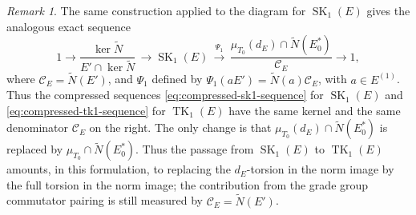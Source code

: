 \documentclass[11pt]{article}
\numberwithin{equation}{section}
\theoremstyle{plain}
\theoremstyle{remark}
\newtheorem{remark}[theorem]{Remark}
\begin{document}
\begin{remark}
\label{rem:compressed-sk1-comparison}
The same construction applied to the \cite{hazrat-wadsworth-2011} diagram for
$\operatorname{SK}_1(E)$ gives the analogous exact sequence
\begin{equation}\label{eq:compressed-sk1-sequence}
        1\longrightarrow
        \frac{\ker\widetilde N}{E'\cap\ker\widetilde N}\,
        \longrightarrow
        \operatorname{SK}_1(E)
        \,\overset{\Psi_1}{\longrightarrow}\,
        \frac{\mu_{T_0}(d_E)\cap\widetilde N(E_0^*)}{\mathcal C_E}
        \longrightarrow 1,
\end{equation}
where $\mathcal C_E=\widetilde N(E')$, and $\Psi_1$ defined by $\Psi_1(aE')=\widetilde N(a)\mathcal C_E$, with 
$a\in E^{(1)}$.
Thus the compressed sequences \eqref{eq:compressed-sk1-sequence} for $\operatorname{SK}_1(E)$ and
\eqref{eq:compressed-tk1-sequence} for $\operatorname{TK}_1(E)$ have the same kernel and the same 
denominator
$\mathcal C_E$ on the right.  The only change is that $\mu_{T_0}(d_E)\cap\widetilde N(E_0^*)$ is replaced by $\mu_{T_0}\cap\widetilde N(E_0^*)$. Thus the passage from $\operatorname{SK}_1(E)$ to 
$\operatorname{TK}_1(E)$
amounts, in this formulation, to replacing the $d_E$-torsion in the norm
image by the full torsion in the norm image; the contribution from the grade
group commutator pairing is still measured by $\mathcal C_E=\widetilde N(E')$.
\end{remark}
\end{document}
